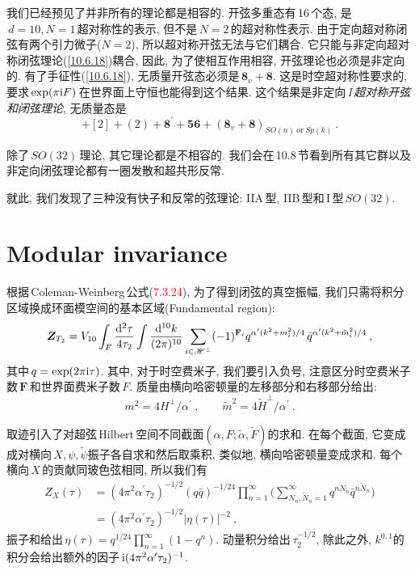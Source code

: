 我们已经预见了并非所有的理论都是相容的. 开弦多重态有\,16\,个态, 是$\,d=10,N=1\,$超对称性的表示, 但不是$\,N=2\,$的超对称性表示. 由于定向超对称闭弦有两个引力微子($N=2$), 所以超对称开弦无法与它们耦合. 它只能与非定向超对称闭弦理论(\ref{10.6.18})耦合, 因此, 为了使相互作用相容, 开弦理论也必须是非定向的. 有了手征性(\ref{10.6.18}), 无质量开弦态必须是$\,\mathbf{8}_{v}+\mathbf{8}$. 这是时空超对称性要求的, 要求$\,\exp(\pi\mathrm{i} F)\,$在世界面上守恒也能得到这个结果. 这个结果是非定向\,\emph{I}\,{\emph{超对称开弦和闭弦理论}}, 无质量态是
\begin{equation}
    [0]+[2]+(2)+\mathbf{8}^{\prime}+\mathbf{56} + (\mathbf{8}_{v}+\mathbf{8})_{SO(n)\:\text{or}\:Sp(k)} \:.\label{10.6.19}
\end{equation}

除了\,$SO(32)\,$理论, 其它理论都是不相容的. 我们会在\,10.8\,节看到所有其它群以及非定向闭弦理论都有一圈发散和超共形反常.

就此, 我们发现了三种没有快子和反常的弦理论: IIA\,型, IIB\,型和\,I\,型$\,SO(32)$.

\section{Modular invariance}


根据\,Coleman-Weinberg\,公式(\textcolor{red}{7.3.24}), 为了得到闭弦的真空振幅, 我们只需将积分区域换成环面模空间的基本区域(Fundamental region):
\begin{equation}
    \bm{Z}_{T_{2}} = V_{10}\int_{F}\frac{\mathrm{d}^{2}\tau}{4\tau_{2}}\int\frac{\mathrm{d}^{10}k}{(2\pi)^{10}}\sum_{i\in\mathscr{H}^{\bot}}(-1)^{\mathbf{F}_{i}}q^{\alpha^{\prime}(k^{2}+m_{i}^{2})/4}\,\bar{q}^{\alpha^{\prime}(k^{2}+\tilde{m}_{i}^{2})/4}\:,\label{10.7.1}
\end{equation}
其中$\,q=\exp(2\pi\mathrm{i}\tau)$. 其中, 对于时空费米子, 我们要引入负号, 注意区分时空费米子数$\,\mathbf{F}\,$和世界面费米子数$\,F$. 质量由横向哈密顿量的左移部分和右移部分给出:
\begin{equation}
    m^{2} = 4H^{\bot}/\alpha^{\prime}\:,\qquad \tilde{m}^{2}=4\tilde{H}^{\bot}/\alpha^{\prime} \: .\label{10.7.2}
\end{equation}


取迹引入了对超弦\,Hilbert\,空间不同截面$(\alpha,F;\tilde{\alpha},\tilde{F})$的求和. 在每个截面, 它变成成对横向$\,X,\psi,\tilde{\psi}$振子各自求和然后取乘积, 类似地, 横向哈密顿量变成求和. 每个横向$\,X\,$的贡献同玻色弦相同, 所以我们有
\begin{align}
    Z_{X}(\tau)&=(4\pi^{2}\alpha^{\prime}\tau_{2})^{-1/2} (q\bar{q})^{-1/24}
    \prod_{n=1}^{\infty}\biggl(
    \sum_{N_{n},\tilde{N}_{n}=1}^{\infty}q^{n N_{n}}\bar{q}^{n\tilde{N}_{n}}\biggr) \nonumber \\
    &=(4\pi^{2}\alpha^{\prime}\tau_{2})^{-1/2} \lvert\eta(\tau)\rvert^{-2} \:,
    \label{10.7.3}
\end{align}
振子和给出$\,\eta(\tau)=q^{1/24}\prod_{n=1}^{\infty}(1-q^{n})$. 动量积分给出$\,\tau_{2}^{-1/2}$, 除此之外, $k^{0,1}$的积分会给出额外的因子$\,\mathrm{i}(4\pi^{2}\alpha^{\prime}\tau_{2})^{-1}$.


